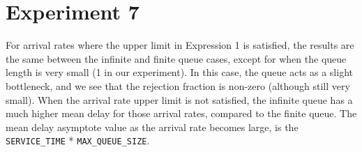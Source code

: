 \section*{Experiment 7}
For arrival rates where the upper limit in Expression 1 is satisfied, the results are the same between the infinite and finite queue cases, except for when the queue length is very small (1 in our experiment).
In this case, the queue acts as a slight bottleneck, and we see that the rejection fraction is non-zero (although still very small).
When the arrival rate upper limit is not satisfied, the infinite queue has a much higher mean delay for those arrival rates, compared to the finite queue.
The mean delay asymptote value as the arrival rate becomes large, is the \texttt{SERVICE_TIME} * \texttt{MAX_QUEUE_SIZE}.
